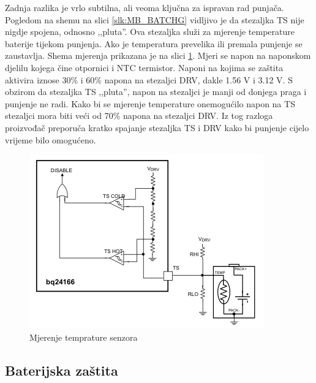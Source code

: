 Zadnja razlika je vrlo subtilna, ali veoma ključna za ispravan rad punjača. Pogledom na shemu na slici \ref{slk:MB_BATCHG} vidljivo je da stezaljka TS nije nigdje spojena, odnosno ,,pluta''. Ova stezaljka služi za mjerenje temperature baterije tijekom punjenja. Ako je temperatura prevelika ili premala punjenje se zaustavlja. Shema mjerenja prikazana je na slici \ref{slk:BATCHG_TS}. Mjeri se napon na naponskom djelilu kojega čine otpornici i NTC termistor. Naponi na kojima se zaštita aktivira iznose 30\% i 60\% napona na stezaljci DRV, dakle 1.56 V i 3.12 V. S obzirom da stezaljka TS ,,pluta'', napon na stezaljci je manji od donjega praga i punjenje ne radi. Kako bi se mjerenje temperature onemogućilo napon na TS stezaljci mora biti veći od 70\% napona na stezaljci DRV. Iz tog razloga proizvođač preporuča kratko spajanje stezaljka TS i DRV kako bi punjenje cijelo vrijeme bilo omogućeno.
\begin{figure}[htb]
    \centering
    \includegraphics[width=\textwidth]{Figures/BATCHG_TS.png}
    \caption{Mjerenje temprature senzora}
    \label{slk:BATCHG_TS}
\end{figure}

\subsection{Baterijska zaštita}
